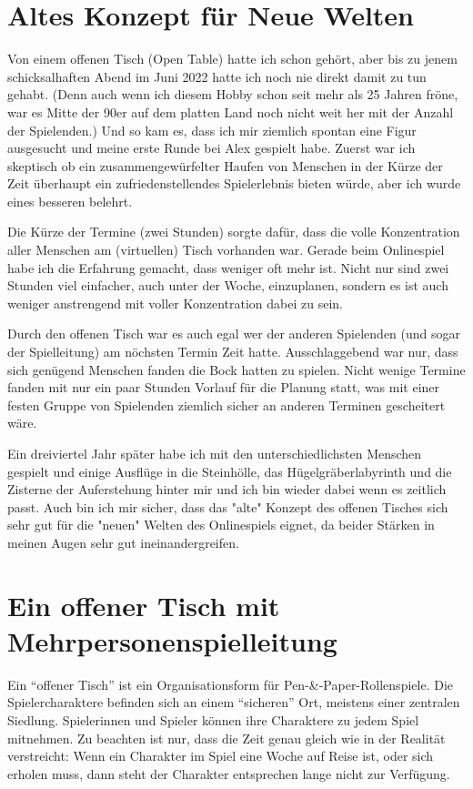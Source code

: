 \documentclass[11pt]{wbzine}
\begin{document}
\begin{multicols}{2}

\section{Altes Konzept für Neue Welten}
Von einem offenen Tisch (Open Table) hatte ich schon gehört, aber bis
zu jenem schicksalhaften Abend im Juni 2022 hatte ich noch nie direkt
damit zu tun gehabt. (Denn auch wenn ich diesem Hobby schon seit mehr
als 25 Jahren fröne, war es Mitte der 90er auf dem platten Land noch
nicht weit her mit der Anzahl der Spielenden.) Und so kam es, dass ich
mir ziemlich spontan eine Figur ausgesucht und meine erste Runde bei Alex
gespielt habe. Zuerst war ich skeptisch ob ein zusammengewürfelter Haufen
von Menschen in der Kürze der Zeit überhaupt ein zufriedenstellendes
Spielerlebnis bieten würde, aber ich wurde eines besseren belehrt.

Die Kürze der Termine (zwei Stunden) sorgte dafür, dass die volle
Konzentration aller Menschen am (virtuellen) Tisch vorhanden war. Gerade
beim Onlinespiel habe ich die Erfahrung gemacht, dass weniger oft
mehr ist. Nicht nur sind zwei Stunden viel einfacher, auch unter der
Woche, einzuplanen, sondern es ist auch weniger anstrengend mit voller
Konzentration dabei zu sein.

Durch den offenen Tisch war es auch egal wer der anderen Spielenden (und
sogar der Spielleitung) am nöchsten Termin Zeit hatte. Ausschlaggebend
war nur, dass sich genügend Menschen fanden die Bock hatten zu
spielen. Nicht wenige Termine fanden mit nur ein paar Stunden Vorlauf
für die Planung statt, was mit einer festen Gruppe von Spielenden
ziemlich sicher an anderen Terminen gescheitert wäre.

Ein dreiviertel Jahr später habe ich mit den unterschiedlichsten
Menschen gespielt und einige Ausflüge in die Steinhölle, das
Hügelgräberlabyrinth und die Zisterne der Auferstehung hinter mir und
ich bin wieder dabei wenn es zeitlich passt. Auch bin ich mir sicher,
dass das "alte" Konzept des offenen Tisches sich sehr gut für die "neuen"
Welten des Onlinespiels eignet, da beider Stärken in meinen Augen sehr
gut ineinandergreifen.

\section{Ein offener Tisch mit Mehrpersonenspielleitung}

Ein “offener Tisch” ist ein Organisationsform für Pen-\&-Paper-Rollenspiele.
Die Spielercharaktere befinden sich an einem “sicheren” Ort, meistens einer
zentralen Siedlung. Spielerinnen und Spieler können ihre Charaktere zu jedem
Spiel mitnehmen. Zu beachten ist nur, dass die Zeit genau gleich wie in der
Realität verstreicht: Wenn ein Charakter im Spiel eine Woche auf Reise ist,
oder sich erholen muss, dann steht der Charakter entsprechen lange nicht zur
Verfügung.


\end{multicols}
\end{document}
